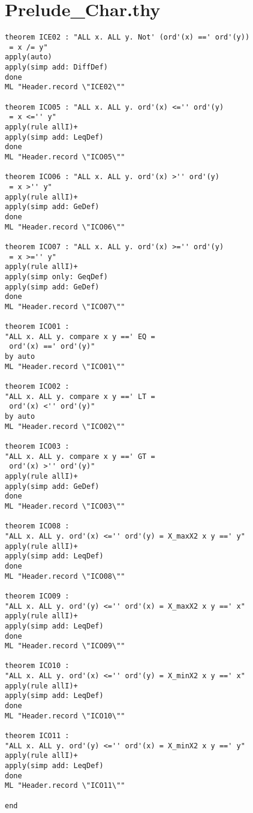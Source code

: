 \section{Prelude\_Char.thy}
\label{appendix:strictProofs:Char}
\begin{multicols}{2}
\tiny
\begin{Verbatim}
theorem ICE02 : "ALL x. ALL y. Not' (ord'(x) ==' ord'(y))
 = x /= y"
apply(auto)
apply(simp add: DiffDef)
done
ML "Header.record \"ICE02\""

theorem ICO05 : "ALL x. ALL y. ord'(x) <='' ord'(y)
 = x <='' y"
apply(rule allI)+
apply(simp add: LeqDef)
done 
ML "Header.record \"ICO05\""

theorem ICO06 : "ALL x. ALL y. ord'(x) >'' ord'(y)
 = x >'' y"
apply(rule allI)+
apply(simp add: GeDef)
done 
ML "Header.record \"ICO06\""

theorem ICO07 : "ALL x. ALL y. ord'(x) >='' ord'(y)
 = x >='' y"
apply(rule allI)+
apply(simp only: GeqDef)
apply(simp add: GeDef)
done 
ML "Header.record \"ICO07\""

theorem ICO01 :
"ALL x. ALL y. compare x y ==' EQ =
 ord'(x) ==' ord'(y)"
by auto
ML "Header.record \"ICO01\""

theorem ICO02 :
"ALL x. ALL y. compare x y ==' LT =
 ord'(x) <'' ord'(y)"
by auto
ML "Header.record \"ICO02\""

theorem ICO03 :
"ALL x. ALL y. compare x y ==' GT =
 ord'(x) >'' ord'(y)"
apply(rule allI)+
apply(simp add: GeDef)
done
ML "Header.record \"ICO03\""

theorem ICO08 :
"ALL x. ALL y. ord'(x) <='' ord'(y) = X_maxX2 x y ==' y"
apply(rule allI)+
apply(simp add: LeqDef)
done
ML "Header.record \"ICO08\""

theorem ICO09 :
"ALL x. ALL y. ord'(y) <='' ord'(x) = X_maxX2 x y ==' x"
apply(rule allI)+
apply(simp add: LeqDef)
done
ML "Header.record \"ICO09\""

theorem ICO10 :
"ALL x. ALL y. ord'(x) <='' ord'(y) = X_minX2 x y ==' x"
apply(rule allI)+
apply(simp add: LeqDef)
done 
ML "Header.record \"ICO10\""

theorem ICO11 :
"ALL x. ALL y. ord'(y) <='' ord'(x) = X_minX2 x y ==' y"
apply(rule allI)+
apply(simp add: LeqDef)
done 
ML "Header.record \"ICO11\""

end
\end{Verbatim}
\end{multicols}

